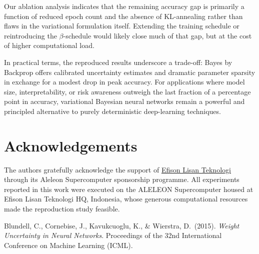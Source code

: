\documentclass{article}
\begin{document}
Our ablation analysis indicates that the remaining accuracy gap is primarily a function of reduced epoch count and the absence of KL-annealing rather than flaws in the variational formulation itself.  Extending the training schedule or reintroducing the $\beta$-schedule would likely close much of that gap, but at the cost of higher computational load.

In practical terms, the reproduced results underscore a trade-off: Bayes by Backprop offers calibrated uncertainty estimates and dramatic parameter sparsity in exchange for a modest drop in peak accuracy.  For applications where model size, interpretability, or risk awareness outweigh the last fraction of a percentage point in accuracy, variational Bayesian neural networks remain a powerful and principled alternative to purely deterministic deep-learning techniques.
\section*{Acknowledgements}

The authors gratefully acknowledge the support of \href{https://efisonlt.com}{Efison Lisan Teknologi} through its Aleleon Supercomputer sponsorship programme.  All experiments reported in this work were executed on the ALELEON Supercomputer housed at Efison Lisan Teknologi HQ, Indonesia, whose generous computational resources made the reproduction study feasible.

\begin{thebibliography}{9}
Blundell, C., Cornebise, J., Kavukcuoglu, K., \& Wierstra, D.\ (2015).  
\textit{Weight Uncertainty in Neural Networks}.  
Proceedings of the 32nd International Conference on Machine Learning (ICML).
\end{thebibliography}
\end{document}
